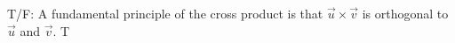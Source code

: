 {T/F: A fundamental principle of the cross product is that $\vec u\times\vec v$ is orthogonal to $\vec u$ and $\vec v$.
}
{T
}
